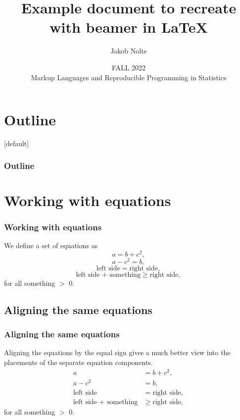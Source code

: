 \documentclass[9pt]{beamer}
\title{Example document to recreate with beamer in \LaTeX}
\author{Jakob Nolte}
\date{FALL 2022 \\
Markup Languages and Reproducible Programming in Statistics}
\begin{document}
\frame{\titlepage}

\section*{Outline}
{
[default]
\begin{frame}
    \frametitle{Outline}
    \hypersetup{linkcolor=black}
    \tableofcontents %
\end{frame}
}

\section{Working with equations}
{
\begin{frame}
\frametitle{Working with equations}

We define a set of equations as \\
\begin{equation}
    a = b + c^2,
\end{equation}
\begin{equation}
    a - c^2 = b,
\end{equation}
\begin{equation}
    \text{left side} = \text{right side},
\end{equation}
\begin{equation}
    \text{left side + something} \geq \text{right side},
\end{equation}
for all something $>$ 0.

\end{frame}
}

\subsection{Aligning the same equations}
{
\begin{frame}
\frametitle{Aligning the same equations}

Aligning the equations by the equal sign gives a much better view into the placements of the separate equation components. \\
\begin{align}
    a &= b + c^2, \\
    a - c^2 &= b, \\
    \text{left side} &= \text{right side}, \\
    \text{left side + something} &\geq \text{right side},
\end{align}
for all something $>$ 0.

\end{frame}
}
\end{document}
